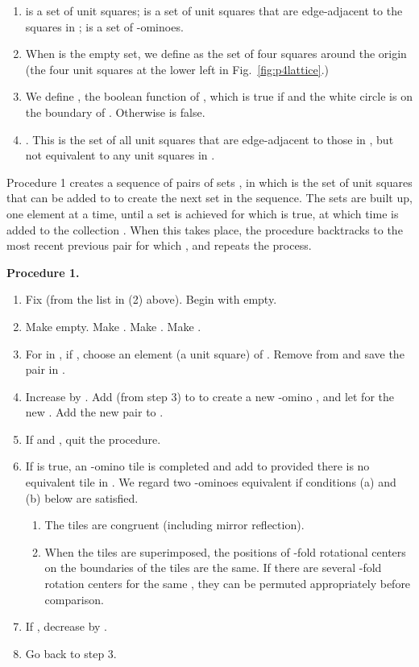 \documentclass{ws-ijcga}
\begin{document}
\begin{enumerate}
\item
 is a set of unit squares;  is a set of unit squares that are edge-adjacent to the squares
in ;  is a set of -ominoes.
\item
When  is the empty set, we define  as the set of four squares around the origin (the
four unit squares at the lower left in Fig.~\ref{fig:p4lattice}.)
\item
We define , the boolean function of , which is true if  and the white circle is on
the boundary of . Otherwise  is false.
\item
. 
This is the set of all unit squares that are
edge-adjacent to those in , but not equivalent to any unit squares in .
\end{enumerate}

Procedure 1 creates a sequence of pairs of sets , 
in which  is the set of unit squares
that can be added to  to create the next set  in the sequence. 
The sets  are built up, one
element at a time, until a set  is achieved for which  is true, 
at which time  is added to the
collection . 
When this takes place, the procedure backtracks to the most recent previous pair
 for which , and repeats the process.

\vspace{1em}
\noindent
{\bf Procedure 1.}
\begin{enumerate}
\item
Fix  (from the list in (2) above). Begin with  empty.
\item
Make  empty. Make . Make . Make .
\item
For  in , if , 
choose an element  (a unit square) of . Remove  from 
and save the pair  in .
\item
Increase  by . Add  (from step 3) to  to create a new -omino , 
and let  for the new . Add the new pair  to .
\item
If  and , quit the procedure.
\item
If  is true, an -omino tile is completed and add  to  provided there is no equivalent
tile in . We regard two -ominoes equivalent if conditions (a) and (b) below are satisfied.
\begin{enumerate}
\item
The tiles are congruent (including mirror reflection).
\label{proc1a}
\item
When the tiles are superimposed, the positions of -fold rotational centers on the
boundaries of the tiles are the same. 
If there are several -fold rotation centers for the same , 
they can be permuted appropriately before comparison.
\label{proc1b}
\end{enumerate}
\item
If , decrease  by .
\item
Go back to step 3.
\end{enumerate}
\end{document}
